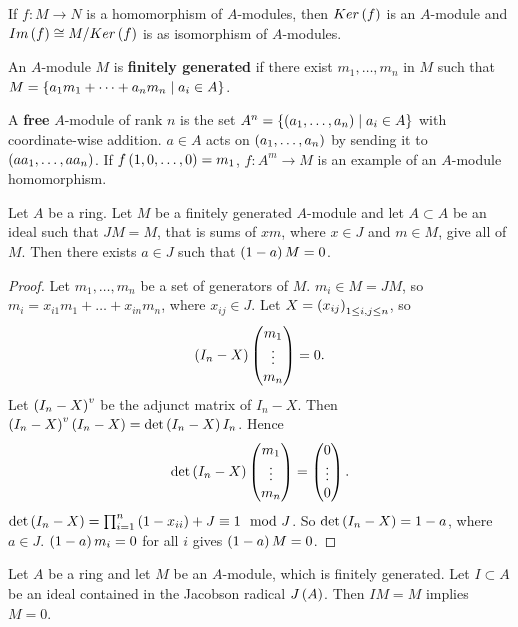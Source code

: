 \begin{definition}
If $ f : M \to N $ is a homomorphism of $ A $-modules, then $ Ker\left( f \right) $ is an $ A $-module and $ Im\left( f \right) \cong M / Ker\left( f \right) $ is as isomorphism of $ A $-modules.
\end{definition}

\begin{definition}
An $ A $-module $ M $ is \textbf{finitely generated} if there exist $ m_1, \dots, m_n $ in $ M $ such that $ M = \left\{ a_1m_1 + \dots + a_nm_n \mid a_i \in A \right\} $.
\end{definition}

\begin{example*}
A \textbf{free} $ A $-module of rank $ n $ is the set $ A^n = \left\{ \left( a_1, \dots, a_n \right) \mid a_i \in A \right\} $ with coordinate-wise addition. $ a \in A $ acts on $ \left( a_1, \dots, a_n \right) $ by sending it to $ \left( aa_1, \dots, aa_n \right) $. If $ f\left( 1, 0, \dots, 0 \right) = m_1 $, $ f : A^m \to M $ is an example of an $ A $-module homomorphism.
\end{example*}

\pagebreak

\begin{lemma}
\label{lem:8.7}
Let $ A $ be a ring. Let $ M $ be a finitely generated $ A $-module and let $ A \subset A $ be an ideal such that $ JM = M $, that is sums of $ xm $, where $ x \in J $ and $ m \in M $, give all of $ M $. Then there exists $ a \in J $ such that $ \left( 1 - a \right)M = 0 $.
\end{lemma}

\begin{proof}
Let $ m_1, \dots, m_n $ be a set of generators of $ M $. $ m_i \in M = JM $, so $ m_i = x_{i1}m_1 + \dots + x_{in}m_n $, where $ x_{ij} \in J $. Let $ X = \left( x_{ij} \right)_{1 \le i, j \le n} $, so
$$ \left( I_n - X \right)\begin{pmatrix} m_1 \\ \vdots \\ m_n \end{pmatrix} = 0. $$
Let $ \left( I_n - X \right)^v $ be the adjunct matrix of $ I_n - X $. Then $ \left( I_n - X \right)^v\left( I_n - X \right) = \det\left( I_n - X \right)I_n $. Hence
$$ \det\left( I_n - X \right)\begin{pmatrix} m_1 \\ \vdots \\ m_n \end{pmatrix} = \begin{pmatrix} 0 \\ \vdots \\ 0 \end{pmatrix}. $$
$ \det\left( I_n - X \right) = \prod_{i = 1}^n \left( 1 - x_{ii} \right) + J \equiv 1 \mod J $. So $ \det\left( I_n - X \right) = 1 - a $, where $ a \in J $. $ \left( 1 - a \right)m_i = 0 $ for all $ i $ gives $ \left( 1 - a \right)M = 0 $.
\end{proof}


\begin{corollary}
Let $ A $ be a ring and let $ M $ be an $ A $-module, which is finitely generated. Let $ I \subset A $ be an ideal contained in the Jacobson radical $ J\left( A \right) $. Then $ IM = M $ implies $ M = 0 $.
\end{corollary}

